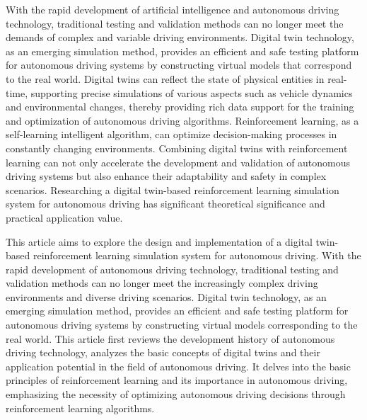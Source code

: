 \begin{abstracten}

With the rapid development of artificial intelligence and autonomous driving technology, traditional 
testing and validation methods can no longer meet the demands of complex and variable driving 
environments. Digital twin technology, as an emerging simulation method, provides an efficient and safe 
testing platform for autonomous driving systems by constructing virtual models that correspond to the 
real world. Digital twins can reflect the state of physical entities in real-time, supporting precise 
simulations of various aspects such as vehicle dynamics and environmental changes, thereby providing 
rich data support for the training and optimization of autonomous driving algorithms. Reinforcement 
learning, as a self-learning intelligent algorithm, can optimize decision-making processes in constantly 
changing environments. Combining digital twins with reinforcement learning can not only accelerate the 
development and validation of autonomous driving systems but also enhance their adaptability and safety 
in complex scenarios. Researching a digital twin-based reinforcement learning simulation system for 
autonomous driving has significant theoretical significance and practical application value.

This article aims to explore the design and implementation of a digital twin-based reinforcement 
learning simulation system for autonomous driving. With the rapid development of autonomous driving 
technology, traditional testing and validation methods can no longer meet the increasingly complex 
driving environments and diverse driving scenarios. Digital twin technology, as an emerging simulation 
method, provides an efficient and safe testing platform for autonomous driving systems by constructing 
virtual models corresponding to the real world. This article first reviews the development history of 
autonomous driving technology, analyzes the basic concepts of digital twins and their application 
potential in the field of autonomous driving. It delves into the basic principles of reinforcement learning 
and its importance in autonomous driving, emphasizing the necessity of optimizing autonomous driving 
decisions through reinforcement learning algorithms.


\end{abstracten}
